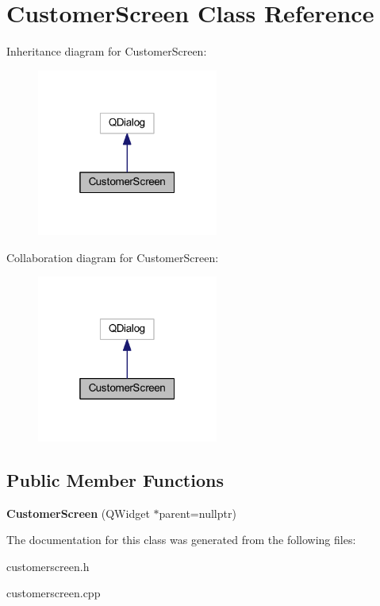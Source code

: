 \hypertarget{class_customer_screen}{}\section{Customer\+Screen Class Reference}
\label{class_customer_screen}


Inheritance diagram for Customer\+Screen\+:\nopagebreak
\begin{figure}[H]
\begin{center}
\leavevmode
\includegraphics[width=169pt]{class_customer_screen__inherit__graph}
\end{center}
\end{figure}


Collaboration diagram for Customer\+Screen\+:\nopagebreak
\begin{figure}[H]
\begin{center}
\leavevmode
\includegraphics[width=169pt]{class_customer_screen__coll__graph}
\end{center}
\end{figure}
\subsection*{Public Member Functions}
\begin{DoxyCompactItemize}
\item 
\mbox{\label{class_customer_screen_a85504dee21d3b41ba89c5084ac0d66d0}} 
{\bfseries Customer\+Screen} (Q\+Widget $\ast$parent=nullptr)
\end{DoxyCompactItemize}


The documentation for this class was generated from the following files\+:\begin{DoxyCompactItemize}
\item 
customerscreen.\+h\item 
customerscreen.\+cpp\end{DoxyCompactItemize}
